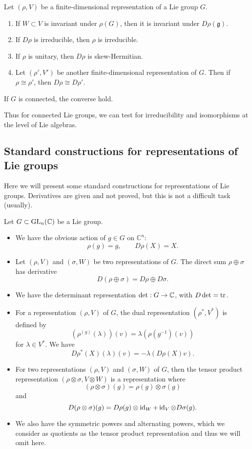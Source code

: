 \begin{proposition}
    Let $(\rho, V)$ be a finite-dimensional representation of a Lie group $G$. 
    \begin{enumerate}
        \item If $W \subset V$ is invariant under $\rho(G)$, then it is invariant under $D\rho(\mathfrak g)$.
        \item If $D\rho$ is irreducible, then $\rho$ is irreducible.
        \item If $\rho$ is unitary, then $D\rho$ is skew-Hermitian.
        \item Let $(\rho', V')$ be another finite-dimensional representation of $G$. Then if $\rho \cong \rho'$, then $D\rho \cong D\rho'$.
    \end{enumerate}
    If $G$ is connected, the converse hold. 
\end{proposition}

Thus for connected Lie groups, we can test for irreducibility and isomorphisms at the level of Lie algebras.

\subsection{Standard constructions for representations of Lie groups}

Here we will present some standard constructions for representations of Lie groups. Derivatives are given and not proved, but this is not a difficult task (usually).

Let $G \subset \operatorname{GL}_n(\mathbb C)$ be a Lie group.
\begin{itemize}
    \item  We have the obvious action of $g \in G$ on $\mathbb C^n$:
    \[ \rho(g) = g, \qquad D\rho(X) = X. \]
    \item Let $(\rho, V)$ and $(\sigma, W)$ be two representations of $G$. The direct sum $\rho \oplus \sigma$ has derivative
    \[ D(\rho \oplus \sigma) = D\rho \oplus D\sigma. \]
    \item We have the determinant representation $\det: G \to \mathbb C$, with $D\det = \operatorname{tr}$. 
    \item For a representation $(\rho, V)$ of $G$, the dual representation $(\rho^*, V^*)$ is defined by
    \[ (\rho^(g)(\lambda))(v) = \lambda(\rho(g^{-1})(v)) \]
    for $\lambda \in V^*$. We have
    \[ D\rho^*(X)(\lambda)(v) = -\lambda(D\rho(X)v). \]
    \item For two representations $(\rho, V)$ and $(\sigma, W)$ of $G$, then the tensor product representation $(\rho \otimes \sigma, V \otimes W)$ is a representation where
    \[ (\rho \otimes \sigma)(g) = \rho(g) \otimes \sigma(g) \]
    and
    \[ D(\rho \otimes \sigma)(g) = D\rho(g) \otimes \operatorname{id}_W + \operatorname{id}_V \otimes D\sigma(g). \]
    \item We also have the symmetric powers and alternating powers, which we consider as quotients as the tensor product representation and thus we will omit here. 
\end{itemize}

